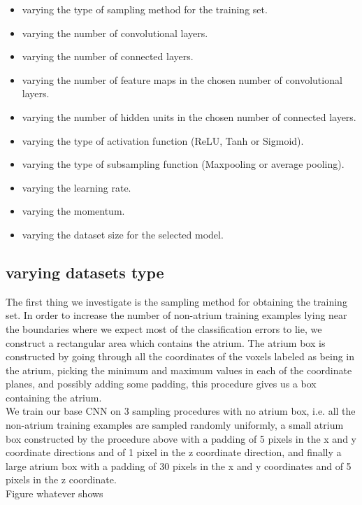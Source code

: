 \begin{itemize}
	\item varying the type of sampling method for the training set.
	\item varying the number of convolutional layers.
	\item varying the number of connected layers.
	\item varying the number of feature maps in the chosen number of convolutional layers.
	\item varying the number of hidden units in the chosen number of connected layers.
	\item varying the type of activation function (ReLU, Tanh or Sigmoid).
	\item varying the type of subsampling function (Maxpooling or average pooling).
	\item varying the learning rate.
	\item varying the momentum.
	\item varying the dataset size for the selected model.
\end{itemize}

\subsection{varying datasets type}

The first thing we investigate is the sampling method for obtaining the training set. In order to increase the number of non-atrium training examples lying near the boundaries where we expect most of the classification errors to lie, we construct a rectangular area which contains the atrium. The atrium box is constructed by going through all the coordinates of the voxels labeled as being in the atrium, picking the minimum and maximum values in each of the coordinate planes, and possibly adding some padding, this procedure gives us a box containing the atrium. \\

We train our base CNN on 3 sampling procedures with no atrium box, i.e. all the non-atrium training examples are sampled randomly uniformly, a small atrium box constructed by the procedure above with a padding of 5 pixels in the x and y coordinate directions and of 1 pixel in the z coordinate direction, and finally a large atrium box with a padding of 30 pixels in the x and y coordinates and of 5 pixels in the z coordinate.\\

Figure whatever shows 

